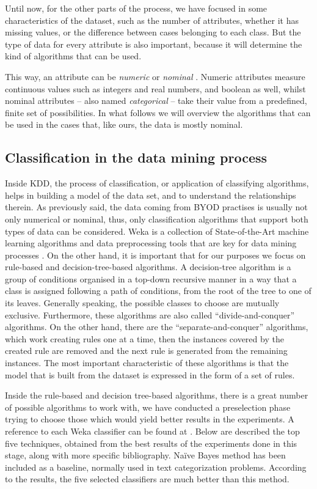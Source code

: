 Until now, for the other parts of the process, we have focused in some characteristics of the dataset, such as the number of attributes, whether it has missing values, or the difference between cases belonging to each class. But the type of data for every attribute is also important, because it will determine the kind of algorithms that can be used.

This way, an attribute can be \textit{numeric} or \textit{nominal} \cite{witten2016data}. Numeric attributes measure continuous values such as integers and real numbers, and boolean as well, whilst nominal attributes -- also named \textit{categorical} -- take their value from a predefined, finite set of possibilities. In what follows we will overview the algorithms that can be used in the cases that, like ours, the data is mostly nominal.

\subsection{Classification in the data mining process}

Inside KDD, the process of classification, or application of classifying algorithms, helps in building a model of the data set, and to understand the relationships therein. As previously said, the data coming from BYOD practises is usually not only numerical or nominal, thus, only classification algorithms that support both types of data can be considered. Weka \cite{weka:site} is a collection of State-of-the-Art machine learning algorithms and data preprocessing tools that are key for data mining processes \cite{witten2016data}. On the other hand, it is important that for our purposes we focus on rule-based and decision-tree-based algorithms. A decision-tree algorithm is a group of conditions organised in a top-down recursive manner in a way that a class is assigned following a path of conditions, from the root of the tree to one of its leaves. Generally speaking, the possible classes to choose are mutually exclusive. Furthermore, these algorithms are also called ``divide-and-conquer'' algorithms. On the other hand, there are the ``separate-and-conquer'' algorithms, which work creating rules one at a time, then the instances covered by the created rule are removed and the next rule is generated from the remaining instances. The most important characteristic of these algorithms is that the model that is built from the dataset is expressed in the form of a set of rules.

Inside the rule-based and decision tree-based algorithms, there is a great number of possible algorithms to work with, we have conducted a preselection phase trying to choose those which would yield better results in the experiments. A reference to each Weka classifier can be found at \cite{witten2016data}. Below are described the top five techniques, obtained from the best results  of the experiments done in this stage, along with more specific bibliography. Na\"{i}ve Bayes method \cite{Bayesian_Classifier_97} has been included as a baseline, normally used in text categorization problems. According to the results, the five selected classifiers are much better than this method.

